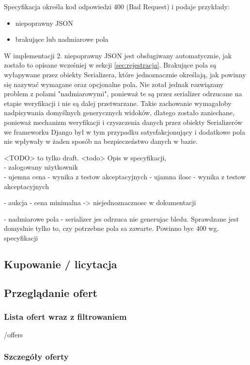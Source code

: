 \documentclass[12pt, notitlepage]{article}
\begin{document}
Specyfikacja określa kod odpowiedzi 400 (Bad Request) i podaje przykłady:
\begin{itemize}
    \item niepoprawny JSON
    \item brakujące lub nadmiarowe pola
\end{itemize}
W implementacji 2. niepoprawny JSON jest obsługiwany automatycznie, jak zostało to opisane wcześniej w sekcji \ref{sec:rejestracja}. Brakujące pola są wyłapywane przez obiekty Serializera, które jednoznacznie określają, jak powinny się nazywać wymagane oraz opcjonalne pola. Nie zotał jednak rozwiązany problem z polami "nadmiarowymi", ponieważ te są przez serializer odrzucane na etapie weryfikacji i nie są dalej przetwarzane. Takie zachowanie wymagałoby nadpisywania domyślnych generycznych widoków, dlatego zostało zaniechane, ponieważ mechanizm weryfikacji i czyszczenia danych przez obiekty Serializerów we frameworku Django był w tym przypadku satysfakcjonujący i dodatkowe pola nie wpływały w żaden sposób na bezpieczeństwo danych w bazie.

<TODO> to tylko draft. <todo>
Opis w specyfikacji, \\
- zalogowany użytkownik \\
- ujemna cena - wynika z testow akceptacyjnych
- ujamna ilosc - wynika z testow akceptacyjnych

- aukcja - cena minimalna -> niejednoznacznosc w dokumentacji

- nadmiarowe pola - serializer jes odrzuca nie generujac bledu. Sprawdzane jest domyslnie tylko to, czy potrzebne pola sa zawarte. Powinno byc 400 wg. specyfikacji

\subsection{Kupowanie / licytacja}
\subsection{Przeglądanie ofert}
\subsubsection{Lista ofert wraz z filtrowaniem}\label{sec:search}
/offers

\subsubsection{Szczegóły oferty}\label{sec:details}
\end{document}
